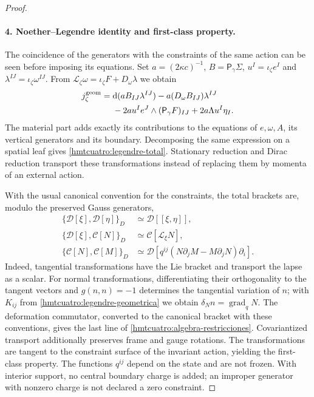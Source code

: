 \begin{proof}
\paragraph{4. Noether--Legendre identity and first-class property.}
The coincidence of the generators with the constraints of the same action can be seen before imposing its equations. Set \(a=(2\kappa c)^{-1}\), \(B=\mathsf P_\gamma\Sigma\), \(u^I=\iota_\zeta e^I\) and \(\lambda^{IJ}=\iota_\zeta\omega^{IJ}\). From \(\mathcal L_\zeta\omega=\iota_\zeta F+D_\omega\lambda\) we obtain
\begin{equation}
 \begin{split}
 j_\zeta^{\rm geom}
 ={}&\mathrm d(a B_{IJ}\lambda^{IJ})
   -a(D_\omega B_{IJ})\lambda^{IJ}\\
 &-2a u^Ie^J\wedge(\mathsf P_\gamma F)_{IJ}
       +2a\Lambda u^I\eta_I .
 \end{split}
 \label{hmtcuatro:noether-legendre}
\end{equation}
The material part adds exactly its contributions to the equations of \(e,\omega,A\), its vertical generators and its boundary. Decomposing the same expression on a spatial leaf gives \eqref{hmtcuatro:legendre-total}. Stationary reduction and Dirac reduction transport these transformations instead of replacing them by momenta of an external action.

With the usual canonical convention for the constraints, the total brackets are, modulo the preserved Gauss generators,
\begin{equation}
 \begin{aligned}
 \{\mathcal D[\xi],\mathcal D[\eta]\}_D
    &\simeq\mathcal D[[\xi,\eta]],\\
 \{\mathcal D[\xi],\mathcal C[N]\}_D
    &\simeq\mathcal C[\mathcal L_\xi N],\\
 \{\mathcal C[N],\mathcal C[M]\}_D
    &\simeq\mathcal D[
       q^{ij}(N\partial_jM-M\partial_jN)\partial_i].
 \end{aligned}
 \label{hmtcuatro:algebra-restricciones}
\end{equation}
Indeed, tangential transformations have the Lie bracket and transport the lapse as a scalar. For normal transformations, differentiating their orthogonality to the tangent vectors and \(g(n,n)=-1\) determines the tangential variation of \(n\); with \(K_{ij}\) from \eqref{hmtcuatro:legendre-geometrica} we obtain \(\delta_N n=\operatorname{grad}_qN\). The deformation commutator, converted to the canonical bracket with these conventions, gives the last line of \eqref{hmtcuatro:algebra-restricciones}. Covariantized transport additionally preserves frame and gauge rotations. The transformations are tangent to the constraint surface of the invariant action, yielding the first-class property. The functions \(q^{ij}\) depend on the state and are not frozen. With interior support, no central boundary charge is added; an improper generator with nonzero charge is not declared a zero constraint.


\end{proof}

